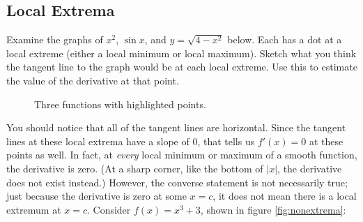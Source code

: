 \subsection{Local Extrema}
Examine the graphs of $x^2$, $\sin{x}$, and $y=\sqrt{4-x^2}$ below. Each has a 
dot at a local extreme (either a local minimum or local maximum). Sketch what 
you think the tangent line to the graph would be at each local extreme. Use 
this to estimate the value of the derivative at that point. 
\begin{figure}[H]
\centering

\begin{minipage}{0.32\textwidth}
\centering
{}
\end{minipage}
\hfill
\begin{minipage}{0.32\textwidth}
\centering
{}
\end{minipage}
\hfill
\begin{minipage}{0.32\textwidth}
\centering
{}
\end{minipage}

\caption{Three functions with highlighted points.}
\end{figure}


You should notice that all of the tangent lines are horizontal. Since the 
tangent lines at these local extrema have a slope of $0$, that tells us $f'(x) 
= 0$ at these points as well. In fact, at \textit{every} local minimum or maximum of a smooth function,
the derivative is zero. (At a sharp corner, like the bottom of $|x|$, the
derivative does not exist instead.) However, the converse 
statement is not necessarily true; just because the derivative is zero at 
some $x = c$, it does not mean there is a local extremum at $x = c$. Consider 
$f(x) = x^3+3$, shown in figure  \ref{fig:nonextrema}:


